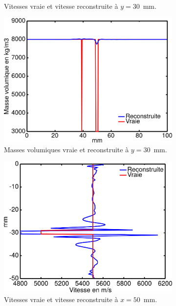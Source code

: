 \begin{figure}[p]
\begin{changemargin}{-2cm}{-2cm}
\begin{subfigure}[b]{0.29\textwidth}
			\caption{Vitesses vraie et vitesse reconstruite à $y=30$~mm.}
		\end{subfigure}
		\begin{subfigure}[b]{0.29\textwidth}
			\includegraphics[width=\textwidth]{img/mono_param/coupe_rho_mono.png}
			\caption{Masses volumiques vraie et reconstruite à $y=30$~mm.}
		\end{subfigure}
				\begin{subfigure}[b]{0.29\textwidth}
			\includegraphics[width=\textwidth]{img/mono_param/coupe_vp_mono_uni_vert.png}
			\caption{Vitesses vraie et vitesse reconstruite à $x=50$~mm.}
		\end{subfigure}
		\begin{subfigure}[b]{0.29\textwidth}

\end{subfigure}
\end{changemargin}
\end{figure}
